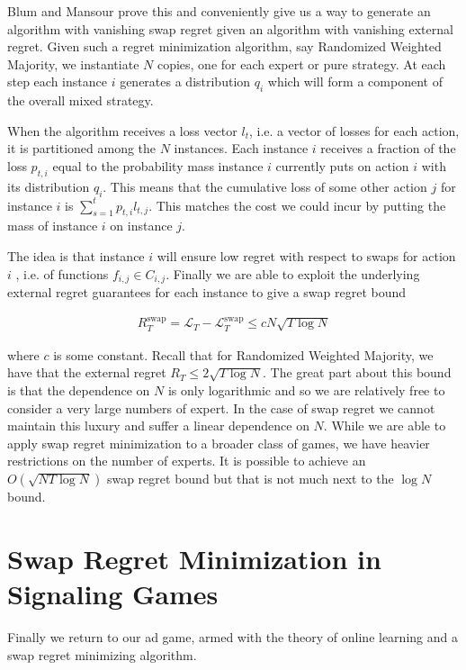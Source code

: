 \documentclass{article}
\begin{document}
Blum and Mansour\cite{blum2007external} prove this and conveniently give us a way to generate an algorithm with vanishing swap regret given an algorithm with vanishing external regret. Given such a regret minimization algorithm, say Randomized Weighted Majority, we instantiate $N$ copies, one for each expert or pure strategy. At each step each instance $i$ generates a distribution $q_i$ which will form a component of the overall mixed strategy.

When the algorithm receives a loss vector $l_t$, i.e. a vector of losses for each action, it is partitioned among the $N$ instances. Each instance $i$ receives a fraction of the loss $p_{t,i}$ equal to the probability mass instance $i$ currently puts on action $i$ with its distribution $q_i$. This means that the cumulative loss of some other action $j$ for instance $i$ is $\sum_{s=1}^t p_{t,i} l_{t,j}$. This matches the cost we could incur by putting the mass of instance $i$ on instance $j$.



The idea is that instance $i$ will ensure low regret with respect to swaps for action $i$ , i.e. of functions $f_{i,j} \in C_{i,j}$. Finally we are able to exploit the underlying external regret guarantees for each instance to give a swap regret bound

\begin{align*}
R_T^{\text{swap}} = \mathcal{L}_T - \mathcal{L}_T^{\text{swap}} \le c N\sqrt{T \log N}
\end{align*}

where $c$ is some constant. Recall that for Randomized Weighted Majority, we have that the external regret $R_T \le 2\sqrt{T \log N}$. The great part about this bound is that the dependence on $N$ is only logarithmic and so we are relatively free to consider a very large numbers of expert. In the case of swap regret we cannot maintain this luxury and suffer a linear dependence on $N$. While we are able to apply swap regret minimization to a broader class of games, we have heavier restrictions on the number of experts. It is possible to achieve an $O(\sqrt{N T \log N})$ swap regret bound but that is not much next to the $\log N$ bound.

\section{Swap Regret Minimization in Signaling Games}

Finally we return to our ad game, armed with the theory of online learning and a swap regret minimizing algorithm. 



\end{document}
